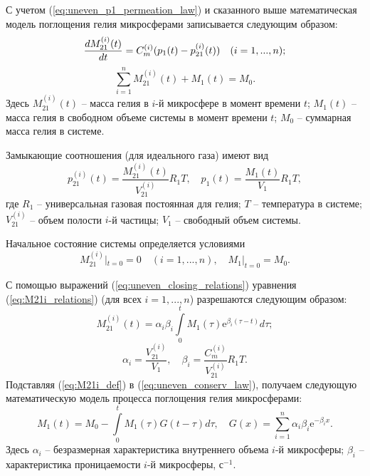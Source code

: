 С учетом (\ref{eq:uneven_p1_permeation_law}) и  сказанного выше  математическая модель поглощения гелия микросферами записывается следующим образом:	
\begin{equation}
\label{eq:M21i_relations}
\frac{dM_{21}^{(i)}(t)}{dt}  =  C_m^{(i)}(p_1(t)-p_{21}^{(i)}(t)) \quad (i=1,...,n);
\end{equation}
\begin{equation}
\label{eq:uneven_conserv_law}
\sum\limits_{i=1}^n M_{21}^{(i)}(t)+M_1(t)   =   M_0.
\end{equation}
Здесь $M_{21}^{(i)}(t)$ -- масса гелия в $i$-й микросфере в момент времени $t$; $M_1(t)$ -- масса гелия в свободном объеме системы в момент времени $t$; $M_0$ -- суммарная масса гелия в системе.

Замыкающие соотношения (для идеального газа) имеют вид
\begin{equation}
\label{eq:uneven_closing_relations}
p_{21}^{(i)}(t) =\frac{M_{21}^{(i)}(t)}{V_{21}^{(i)}} R_1 T, \quad p_{1}(t) =\frac{M_{1}(t)}{V_{1}} R_1 T,
\end{equation}	
где $R_1$ -- универсальная газовая постоянная для гелия; $T$ -- температура в системе; $V_{21}^{(i)}$ -- объем полости $i$-й частицы; $V_1$ -- свободный объем системы.

Начальное состояние системы определяется условиями
\[
M_{21}^{(i)}|_{t=0} =0 \quad (i=1,...,n),\quad M_1|_{t=0} = M_0.
\]


С помощью выражений (\ref{eq:uneven_closing_relations}) уравнения (\ref{eq:M21i_relations}) (для всех $i=1,...,n$) разрешаются следующим образом:
\begin{equation}
\label{eq:M21i_def}
M_{21}^{(i)}(t)=\alpha_i\beta_i\int\limits_{0}^{t}M_1(\tau) \mathrm{e}^{\beta_i (\tau-t)} d\tau;
\end{equation}
\begin{equation}
\label{eq:uneven_alpha_beta_def}
\alpha_i = \frac{V_{21}^{(i)}}{V_1},\quad \beta_i = \frac{C_m^{(i)}}{V_{21}^{(i)}}R_1T.
\end{equation}
Подставляя (\ref{eq:M21i_def}) в (\ref{eq:uneven_conserv_law}), получаем следующую математическую модель процесса поглощения гелия микросферами:
\begin{equation}
\label{eq:uneven_descrete_model}
M_1(t)=M_0-\int\limits_{0}^{t}  M_1(\tau)  G(t-\tau) d\tau, \quad
G(x) = \sum\limits_{i=1}^{n}\alpha_i \beta_i  \mathrm{e}^{-\beta_i x}.
\end{equation}
Здесь $\alpha_i$ -- безразмерная характеристика внутреннего объема $i$-й микросферы; $\beta_i$ -- характеристика проницаемости $i$-й микросферы, с$^{-1}$.

